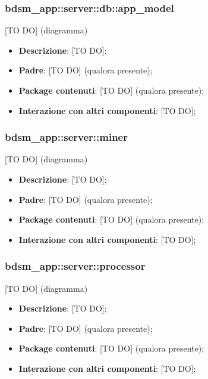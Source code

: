 				

  \subsubsection{bdsm\_app::server::db::app\_model} %
  \label{ssub:bdsm_app_server_app_model}
  [TO DO] (diagramma) \newline \newline

  \begin{itemize}
    \item \textbf{Descrizione}: [TO DO];
    \item \textbf{Padre}: [TO DO] (qualora presente);
    \item \textbf{Package contenuti}: [TO DO] (qualora presente);
    \item \textbf{Interazione con altri componenti}: [TO DO];
  \end{itemize}
  
	  \subsubsection{bdsm\_app::server::miner} %
  \label{ssub:bdsm_app_server_miner}
  [TO DO] (diagramma) \newline \newline

  \begin{itemize}
    \item \textbf{Descrizione}: [TO DO];
    \item \textbf{Padre}: [TO DO] (qualora presente);
    \item \textbf{Package contenuti}: [TO DO] (qualora presente);
    \item \textbf{Interazione con altri componenti}: [TO DO];
  \end{itemize}
  
  	  \subsubsection{bdsm\_app::server::processor} %
  \label{ssub:bdsm_app_server_processor}
  [TO DO] (diagramma) \newline \newline

  \begin{itemize}
    \item \textbf{Descrizione}: [TO DO];
    \item \textbf{Padre}: [TO DO] (qualora presente);
    \item \textbf{Package contenuti}: [TO DO] (qualora presente);
    \item \textbf{Interazione con altri componenti}: [TO DO];
  \end{itemize}

